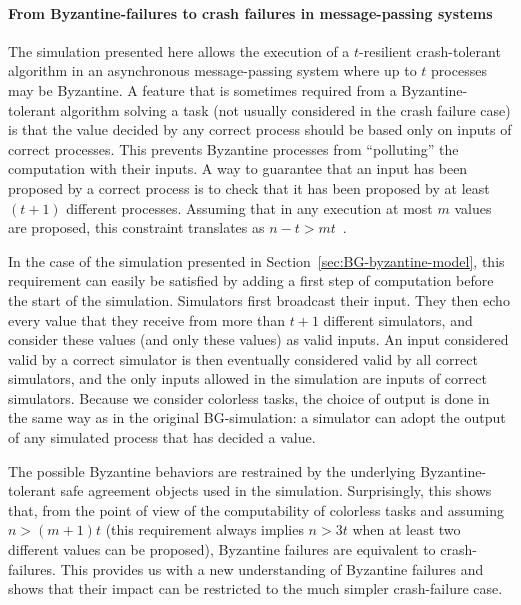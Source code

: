 \documentclass[11pt,letterpaper]{article}
\begin{document}
\paragraph{From Byzantine-failures to crash 
failures in message-passing systems}
The simulation presented here allows the execution of a 
$t$-resilient crash-tolerant algorithm in an asynchronous
message-passing system where up to $t$ processes may be Byzantine.
A  feature that is sometimes required from a Byzantine-tolerant algorithm
solving a task (not usually  considered in the crash failure case)
is that the value decided by any correct process should be based only
on  inputs of  correct processes. This prevents Byzantine processes
from ``polluting'' the computation with their inputs.
 A way to guarantee that an input has
been proposed by a correct process is to check that it has been
proposed by at least $(t+1)$ different processes. Assuming that
in any execution at most $m$ values are proposed,  this constraint
translates as $n-t>mt$~\cite{HKR14,MTH14}. 


In the case of the simulation presented in
Section~\ref{sec:BG-byzantine-model}, this requirement can easily be
satisfied by adding a first step of computation before the start of
the simulation. Simulators first broadcast their input. They then echo
every value that they receive from more than $t+1$ different
simulators, and consider these values (and only these values) as valid
inputs. An input considered valid by a correct simulator is then
eventually considered valid by all correct simulators, and the only
inputs allowed in the simulation are inputs of correct simulators.
Because we consider colorless tasks, the choice of output is done in the 
same way as in the original BG-simulation: a simulator can adopt the 
output of any simulated process that has decided a value.

The possible Byzantine behaviors are restrained by the underlying
Byzantine-tolerant safe agreement objects used in the simulation.
Surprisingly, this shows that, from the point of view of the
computability of colorless tasks and assuming $n>(m+1)t$ (this
requirement always implies $n>3t$ when at least two different values
can be proposed), Byzantine failures are equivalent to crash-failures.
This provides us with a new understanding of Byzantine failures and
shows that their impact can be restricted to the much simpler
crash-failure case.
\end{document}
